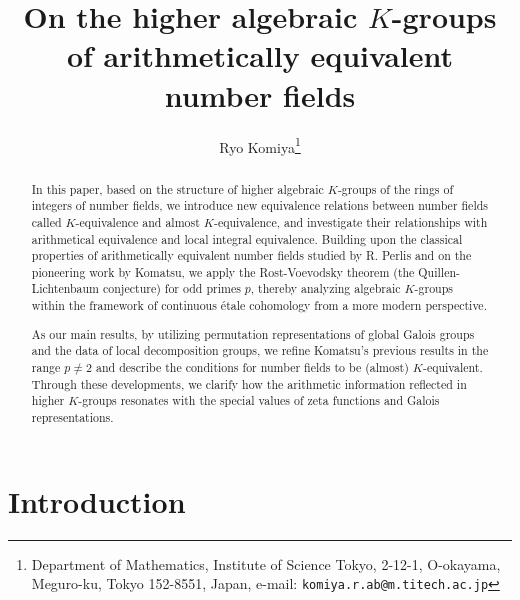 \documentclass{article}
\numberwithin{equation}{section} %
\begin{document}
    \title{On the higher algebraic $K$-groups of arithmetically equivalent number fields}

    \author{Ryo Komiya\footnote{Department of Mathematics, Institute of Science Tokyo, 2-12-1, O-okayama, Meguro-ku, Tokyo 152-8551, Japan, 
e-mail: \texttt{komiya.r.ab@m.titech.ac.jp}}}

    \date{} 

    \maketitle

    \begin{abstract}
        In this paper, based on the structure of higher algebraic $K$-groups of the rings of integers of number fields, we introduce new equivalence relations between number fields called $K$-equivalence and almost $K$-equivalence, and investigate their relationships with arithmetical equivalence and local integral equivalence. Building upon the classical properties of arithmetically equivalent number fields studied by R. Perlis and on the pioneering work by Komatsu, we apply the Rost-Voevodsky theorem (the Quillen-Lichtenbaum conjecture) for odd primes $p$, thereby analyzing algebraic $K$-groups within the framework of continuous étale cohomology from a more modern perspective.
        
        As our main results, by utilizing permutation representations of global Galois groups and the data of local decomposition groups, we refine Komatsu's previous results in the range $p \neq 2$ and describe the conditions for number fields to be (almost) $K$-equivalent. Through these developments, we clarify how the arithmetic information reflected in higher $K$-groups resonates with the special values of zeta functions and Galois representations.
    \end{abstract}
   

    \section{Introduction}
    
\end{document}

